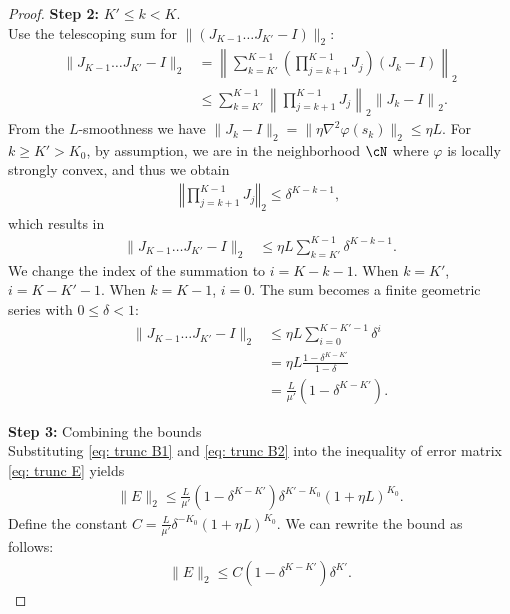 \documentclass{article}
\begin{document}
\begin{proof}
    \textbf{Step 2:} $K' \leq k < K$. \\
    Use the telescoping sum for $\| (J_{K-1} \dots J_{K'} - I) \|_2$: 
    \begin{align*}
        \| J_{K-1} \dots J_{K'} - I \|_2 &=  \left \|\sum_{k = K'}^{K-1} \left( \prod_{j=k+1}^{K-1} J_j \right) (J_k-I) \right\|_2 \\
        & \leq \sum_{k = K'}^{K-1} \left\|\prod_{j=k+1}^{K-1} J_j \right\|_2 \left\| J_k-I \right\|_2.
    \end{align*}
    From the $L$-smoothness we have $\| J_k - I \|_2 = \| \eta \nabla^2 \varphi (s_k) \|_2 \leq \eta L$. 
    For $k \geq K' > K_0$, by assumption, we are in the neighborhood $\cN$ where $\varphi$ is locally strongly convex, and thus we obtain 
    \begin{align*}
        \left\Vert \prod_{j=k+1}^{K-1} J_j \right\Vert_2 \leq \delta^{K-k-1},
    \end{align*}
    which results in 
    \begin{align*}
        \| J_{K-1} \dots J_{K'} - I \|_2 &\leq \eta L \sum_{k = K'}^{K-1} \delta^{K-k-1}.      
    \end{align*}
    We change the index of the summation to $i=K-k-1$. When $k=K'$, $i=K-K'-1$. When $k=K-1$, $i=0$. The sum becomes a finite geometric series with $0 \leq \delta < 1$:
    \begin{align}\label{eq: trunc B2}
        \| J_{K-1} \dots J_{K'} - I \|_2 &\leq \eta L \sum_{i = 0}^{K-K'-1} \delta^{i} \nonumber\\
        &= \eta L\frac{1 - \delta^{K-K'}}{1- \delta}   \nonumber\\
        &= \frac{L} {\mu'}(1 - \delta^{K-K'}).
    \end{align}

    \textbf{Step 3:} Combining the bounds  \\
    Substituting \eqref{eq: trunc B1} and \eqref{eq: trunc B2} into the inequality of error matrix \eqref{eq: trunc E} yields
    \begin{align*}
        \| E\|_2 \leq \frac{L}{\mu'}(1- \delta^{K-K'}) \delta^{K' - K_0} (1 +\eta L)^{K_0}.
    \end{align*}
    Define the constant $C = \frac{L}{\mu'} \delta^{-K_0}(1 + \eta L)^{K_0}$. We can rewrite the bound as follows:
    \begin{align*}
        \| E\|_2 \leq C (1- \delta^{K-K'})\delta^{K'}.
    \end{align*}    
\end{proof}
\end{document}
